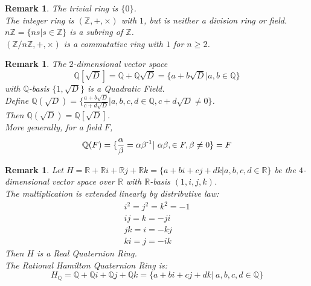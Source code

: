 \documentclass[a4paper,8pt]{article}
\theoremstyle{theorem}
\newtheorem{remark}[theorem]{Remark}
\begin{document}
\begin{remark}
The \textit{{\color{blue} trivial ring}} is $\{0\}$.\\
The \textit{{\color{blue} integer ring}} is $(\mathbb{Z}, +, \times )$ with $ 1 $, but is neither a division ring or field.\\
$n \mathbb{Z} = \{ns | s \in \mathbb{Z}\} $ is a subring of $\mathbb{Z}$.\\
$(\mathbb{Z} / n \mathbb{Z}, +, \times) $ is a commutative ring with $ 1 $ for $ n \geq 2 $.\\
\end{remark}


\begin{remark}
The $2$-dimensional vector space 
\begin{equation}
\mathbb{Q}[\sqrt{D}] = \mathbb{Q} + \mathbb{Q}\sqrt{D} = \{a+b\sqrt{D}|a, b \in \mathbb{Q} \}
\nonumber
\end{equation}
with $\mathbb{Q}$-basis $\{1, \sqrt{D} \}$ is a \textit{{\color{blue} Quadratic Field}}.\\
Define $\mathbb{Q}(\sqrt{D}) = \{ \frac{ a+b\sqrt{D} }{ c+d\sqrt{D} } | a, b, c, d \in \mathbb{Q}, c + d\sqrt{D} \neq 0 \} $. \\
Then $\mathbb{Q}(\sqrt{D}) = \mathbb{Q}[\sqrt{D}]$.\\
More generally, for a field $F$, 
\begin{equation}
\mathbb{Q}(F) = \{\frac{\alpha}{\beta} = \alpha \beta \textsuperscript{-1} |\ \alpha \beta , \in F, \beta \neq 0\} = F
\nonumber
\end{equation}
\end{remark}


\begin{remark}
Let $H=\mathbb{R} + \mathbb{R} i + \mathbb{R} j + \mathbb{R} k = \{a+bi+cj+dk|a,b,c,d \in \mathbb{R}\}$ be the $4$-dimensional vector space over $\mathbb{R}$ with $\mathbb{R}$-basis $(1, i, j, k)$.\\
The multiplication is extended linearly by distributive law: 
\begin{align}
i^2 = j^2 = k^2 = -1 \nonumber \\
ij=k=-ji \nonumber \\
jk=i=-kj \nonumber \\
ki=j=-ik \nonumber
\end{align}
Then $H$ is a \textit{{\color{blue} Real Quaternion Ring}}.\\
The \textit{{\color{blue} Rational Hamilton Quaternion Ring}} is:
\begin{equation}
H_\mathbb{Q}=\mathbb{Q}+\mathbb{Q}i+\mathbb{Q}j+\mathbb{Q}k=\{a+bi+cj+dk|\ a, b, c, d\in \mathbb{Q}\} \nonumber
\end{equation}
\end{remark}
\end{document}
